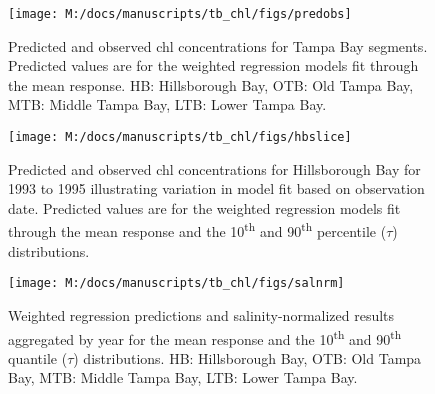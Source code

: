 \documentclass[letterpaper,12pt,oneside]{article}\usepackage{graphicx, color}
\begin{document}
\begin{landscape}
\centering\vspace*{\fill}
\begin{figure}[!ht]


{\centering \texttt{[image: M:/docs/manuscripts/tb\_chl/figs/predobs]} 

}

\caption[Predicted and observed \ac{chl} concentrations for Tampa Bay segments]{Predicted and observed \ac{chl} concentrations for Tampa Bay segments. Predicted values are for the weighted regression models fit through the mean response. HB: Hillsborough Bay, OTB: Old Tampa Bay, MTB: Middle Tampa Bay, LTB: Lower Tampa Bay.\label{fig:predobs}}
\end{figure}



\vfill
\end{landscape}

\centering\vspace*{\fill}
\begin{figure}[!ht]


{\centering \texttt{[image: M:/docs/manuscripts/tb\_chl/figs/hbslice]} 

}

\caption[Predicted and observed \ac{chl} concentrations for Hillsborough Bay for 1993 to 1995 illustrating variation in model fit based on observation date]{Predicted and observed \ac{chl} concentrations for Hillsborough Bay for 1993 to 1995 illustrating variation in model fit based on observation date. Predicted values are for the weighted regression models fit through the mean response and the 10\textsuperscript{th} and 90\textsuperscript{th} percentile ($\tau$) distributions.\label{fig:hbslice}}
\end{figure}



\vfill

\begin{landscape}
\centering\vspace*{\fill}
\begin{figure}[!ht]


{\centering \texttt{[image: M:/docs/manuscripts/tb\_chl/figs/salnrm]} 

}

\caption[Weighted regression predictions and salinity-normalized results aggregated by year for the mean response and the 10\textsuperscript{th} and 90\textsuperscript{th} quantile ($\tau$) distributions]{Weighted regression predictions and salinity-normalized results aggregated by year for the mean response and the 10\textsuperscript{th} and 90\textsuperscript{th} quantile ($\tau$) distributions. HB: Hillsborough Bay, OTB: Old Tampa Bay, MTB: Middle Tampa Bay, LTB: Lower Tampa Bay.\label{fig:salnrm}}
\end{figure}



\vfill
\end{landscape}
\end{document}
